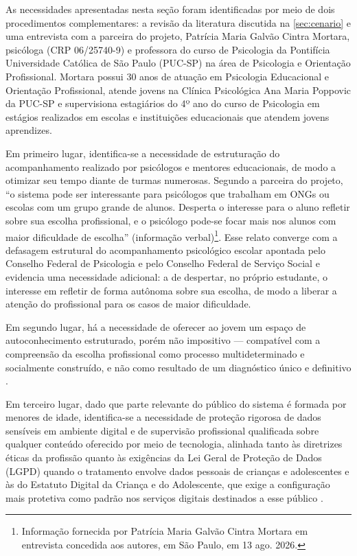 As necessidades apresentadas nesta seção foram identificadas por meio de dois procedimentos complementares: a revisão da literatura discutida na \autoref{sec:cenario} e uma entrevista com a parceira do projeto, Patrícia Maria Galvão Cintra Mortara, psicóloga (CRP 06/25740-9) e professora do curso de Psicologia da Pontifícia Universidade Católica de São Paulo (PUC-SP) na área de Psicologia e Orientação Profissional. Mortara possui 30 anos de atuação em Psicologia Educacional e Orientação Profissional, atende jovens na Clínica Psicológica Ana Maria Poppovic da PUC-SP e supervisiona estagiários do 4º ano do curso de Psicologia em estágios realizados em escolas e instituições educacionais que atendem jovens aprendizes.

Em primeiro lugar, identifica-se a necessidade de estruturação do acompanhamento realizado por psicólogos e mentores educacionais, de modo a otimizar seu tempo diante de turmas numerosas. Segundo a parceira do projeto, ``o sistema pode ser interessante para psicólogos que trabalham em ONGs ou escolas com um grupo grande de alunos. Desperta o interesse para o aluno refletir sobre sua escolha profissional, e o psicólogo pode-se focar mais nos alunos com maior dificuldade de escolha'' (informação verbal)\footnote{Informação fornecida por Patrícia Maria Galvão Cintra Mortara em entrevista concedida aos autores, em São Paulo, em 13 ago. 2026.}. Esse relato converge com a defasagem estrutural do acompanhamento psicológico escolar apontada pelo Conselho Federal de Psicologia e pelo Conselho Federal de Serviço Social \cite{cfpcfess2022} e evidencia uma necessidade adicional: a de despertar, no próprio estudante, o interesse em refletir de forma autônoma sobre sua escolha, de modo a liberar a atenção do profissional para os casos de maior dificuldade.

Em segundo lugar, há a necessidade de oferecer ao jovem um espaço de autoconhecimento estruturado, porém não impositivo --- compatível com a compreensão da escolha profissional como processo multideterminado e socialmente construído, e não como resultado de um diagnóstico único e definitivo \cite{martins2024,gomes2020}.

Em terceiro lugar, dado que parte relevante do público do sistema é formada por menores de idade, identifica-se a necessidade de proteção rigorosa de dados sensíveis em ambiente digital e de supervisão profissional qualificada sobre qualquer conteúdo oferecido por meio de tecnologia, alinhada tanto às diretrizes éticas da profissão \cite{cfp2025mundodigital} quanto às exigências da Lei Geral de Proteção de Dados (LGPD) quando o tratamento envolve dados pessoais de crianças e adolescentes \cite{brasil2018lgpd} e às do Estatuto Digital da Criança e do Adolescente, que exige a configuração mais protetiva como padrão nos serviços digitais destinados a esse público \cite{brasil2025lei15211}.

